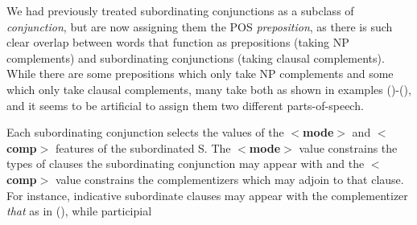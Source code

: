 We had previously treated subordinating conjunctions as a subclass of
{\em conjunction}, but are now assigning them the POS {\em
preposition}, as there is such clear overlap between words that
function as prepositions (taking NP complements) and subordinating
conjunctions (taking clausal complements). While there are some
prepositions which only take NP complements and some which only take
clausal complements, many take both as shown in examples
()-(), and it seems to be artificial to assign them two
different parts-of-speech.


Each subordinating conjunction selects the values of the {\bf
$<$mode$>$} and {\bf $<$comp$>$} features of the subordinated S. The
{\bf $<$mode$>$} value constrains the types of clauses the
subordinating conjunction may appear with and the {\bf $<$comp$>$}
value constrains the complementizers which may adjoin to that
clause. For instance, indicative subordinate clauses may appear with
the complementizer {\it that} as in (), while participial
